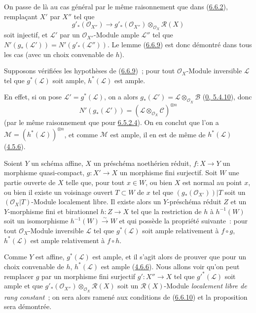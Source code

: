 On passe de là au cas général par le même raisonnement que dans
(\hyperref[II.6.6.2-fr]{6.6.2}), remplaçant $X'$ par $X''$ tel que
\[
g'_*(\mathcal{O}_{X''})\longrightarrow
g'_*(\mathcal{O}_{X''})\otimes_{\mathcal{O}_X}\mathcal{R}(X)
\]
soit injectif, et $\mathcal{L}'$ par un $\mathcal{O}_{X''}$-Module ample
$\mathcal{L}''$ tel que
$N'(g_*(\mathcal{L}'))=N'(g'_*(\mathcal{L}''))$. Le lemme
(\hyperref[II.6.6.9-fr]{6.6.9}) est donc démontré dans tous les cas (avec un
choix convenable de $h$).

\begin{corollary}[6.6.10]
\label{II.6.6.10-fr}
Supposons vérifiées les hypothèses de
(\hyperref[II.6.6.9-fr]{6.6.9})~; pour tout $\mathcal{O}_X$-Module inversible
$\mathcal{L}$ tel que $g^*(\mathcal{L})$ soit ample, $h^*(\mathcal{L})$ est
ample.
\end{corollary}

En effet, si on pose $\mathcal{L}'=g^*(\mathcal{L})$, on a alors
$g_*(\mathcal{L}')=\mathcal{L}\otimes_{\mathcal{O}_X}\mathcal{B}$
(\hyperref[0.5.4.10-fr]{0, 5.4.10}), donc
\[
N'(g_*(\mathcal{L}'))=
(\mathcal{L}\otimes_{\mathcal{O}_X}\mathcal{C})^{\otimes n}
\]
(par le même raisonnement que pour
\hyperref[II.6.5.2.4-fr]{6.5.2.4}). On en conclut que l'on a
$\mathcal{M}=(h^*(\mathcal{L}))^{\otimes n}$, et comme $\mathcal{M}$ est
ample, il en est de même de $h^*(\mathcal{L})$
(\hyperref[II.4.5.6-fr]{4.5.6}).

\begin{proposition}[6.6.11]
\label{II.6.6.11-fr}
Soient $Y$ un schéma affine, $X$ un préschéma noethérien réduit,
$f:X\to Y$ un morphisme quasi-compact, $g:X'\to X$ un morphisme fini
surjectif. Soit $W$ une partie ouverte de $X$ telle que, pour tout $x\in W$,
ou bien $X$ est normal au point $x$, ou bien il existe un voisinage ouvert
$T\subset W$ de $x$ tel que $(g_*(\mathcal{O}_{X'}))|T$ soit un
$(\mathcal{O}_X|T)$-Module localement libre. Il existe alors un
$Y$-préschéma réduit $Z$ et un $Y$-morphisme fini et birationnel
$h:Z\to X$ tel que la restriction de $h$ à $h^{-1}(W)$ soit un isomorphisme
$h^{-1}(W)\xrightarrow{\sim}W$ et qui possède la propriété suivante~: pour
tout $\mathcal{O}_X$-Module inversible $\mathcal{L}$ tel que
$g^*(\mathcal{L})$ soit ample relativement à $f\circ g$, $h^*(\mathcal{L})$
est ample relativement à $f\circ h$.
\end{proposition}

Comme $Y$ est affine, $g^*(\mathcal{L})$ est ample, et il s'agit alors de
prouver que pour un choix convenable de $h$, $h^*(\mathcal{L})$ est ample
(\hyperref[II.4.6.6-fr]{4.6.6}). Nous allons voir qu'on peut remplacer $g$
par un morphisme fini surjectif $g':X''\to X$ tel que
${g'}^*(\mathcal{L})$ soit ample et que
$g'_*(\mathcal{O}_{X''})\otimes_{\mathcal{O}_X}\mathcal{R}(X)$ soit un
$\mathcal{R}(X)$-Module \emph{localement libre de rang constant}~; on sera
alors ramené aux conditions de (\hyperref[II.6.6.10-fr]{6.6.10}) et la
proposition sera démontrée.

